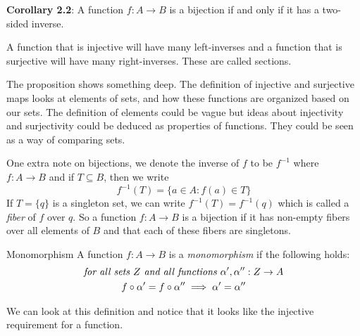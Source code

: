 \documentclass{report}
\begin{document}
\textbf{Corollary 2.2}: A function $f : A \rightarrow B$ is a bijection if and only if it has a two-sided inverse.

    A function that is injective will have many left-inverses and a function that is surjective will have many right-inverses. These are called sections.

    The proposition shows something deep. The definition of injective and surjective maps looks at elements of sets, and how these functions are organized based on our sets. The definition of elements could be vague but ideas about injectivity and surjectivity could be deduced as properties of functions. They could be seen as a way of comparing sets.

    One extra note on bijections, we denote the inverse of $f$ to be $f^{-1}$ where $f : A \rightarrow B$ and if $T \subseteq B$, then we write 
        \begin{equation*}
            f^{-1}(T) = \{a \in A : f(a) \in T\}
        \end{equation*}
    If $T = \{q\}$ is a singleton set, we can write $f^{-1}(T) = f^{-1}(q)$ which is called a \textit{fiber} of $f$ over $q$. So a function $f : A \rightarrow B$ is a bijection if it has non-empty fibers over all elements of $B$ and that each of these fibers are singletons.

\begin{definition}[\label{def:1.2.6}]{Monomorphism}
    A function $f: A \rightarrow B$ is a \textit{monomorphism} if the following holds:
    \begin{gather*}
        \text{\textit{for all sets $Z$ and all functions $\alpha^{\prime}, \alpha^{\prime\prime}: Z \rightarrow A$}} \\
        f \circ \alpha^{\prime} = f \circ \alpha^{\prime\prime} \implies \alpha^{\prime} = \alpha^{\prime\prime}
    \end{gather*}
\end{definition}

We can look at this definition and notice that it looks like the injective requirement for a function.
\end{document}

